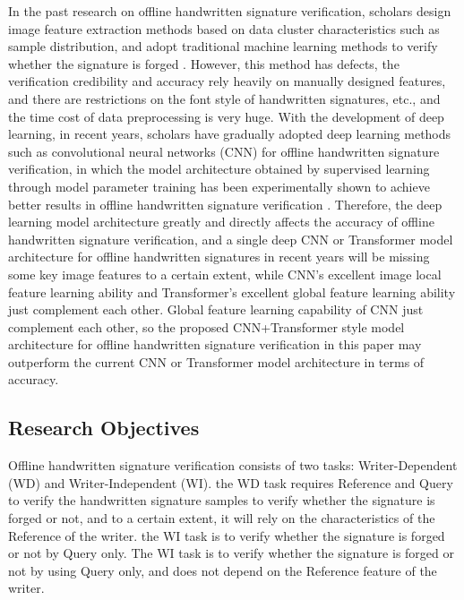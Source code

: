 \documentclass{article}
\begin{document}
In the past research on offline handwritten signature verification, scholars design image feature extraction methods based on data cluster characteristics such as sample distribution, and adopt traditional machine learning methods to verify whether the signature is forged \cite{1}. However, this method has defects, the verification credibility and accuracy rely heavily on manually designed features, and there are restrictions on the font style of handwritten signatures, etc., and the time cost of data preprocessing is very huge. With the development of deep learning, in recent years, scholars have gradually adopted deep learning methods such as convolutional neural networks (CNN) for offline handwritten signature verification, in which the model architecture obtained by supervised learning through model parameter training has been experimentally shown to achieve better results in offline handwritten signature verification \cite{2}. Therefore, the deep learning model architecture greatly and directly affects the accuracy of offline handwritten signature verification, and a single deep CNN or Transformer \cite{9} model architecture for offline handwritten signatures in recent years will be missing some key image features to a certain extent, while CNN's excellent image local feature learning ability and Transformer's excellent global feature learning ability just complement each other. Global feature learning capability of CNN just complement each other, so the proposed CNN+Transformer style model architecture for offline handwritten signature verification in this paper may outperform the current CNN or Transformer model architecture in terms of accuracy.

\newpage

\subsection{Research Objectives}

Offline handwritten signature verification consists of two tasks: Writer-Dependent (WD) and Writer-Independent (WI). the WD task requires Reference and Query to verify the handwritten signature samples to verify whether the signature is forged or not, and to a certain extent, it will rely on the characteristics of the Reference of the writer. the WI task is to verify whether the signature is forged or not by Query only. The WI task is to verify whether the signature is forged or not by using Query only, and does not depend on the Reference feature of the writer.
\end{document}
